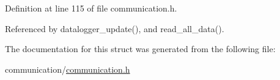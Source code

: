 Definition at line 115 of file communication.\-h.



Referenced by datalogger\-\_\-update(), and read\-\_\-all\-\_\-data().



The documentation for this struct was generated from the following file\-:\begin{DoxyCompactItemize}
\item 
communication/\hyperlink{communication_2communication_8h}{communication.\-h}\end{DoxyCompactItemize}
